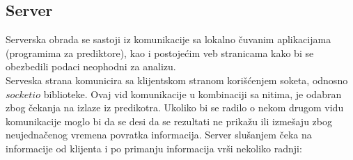 \subsection{Server} 
 Serverska obrada se sastoji iz komunikacije sa lokalno čuvanim aplikacijama (programima za prediktore), kao i postojećim veb stranicama kako bi se obezbedili podaci neophodni za analizu.\\
 
Serveska strana komunicira sa klijentskom stranom korišćenjem soketa, odnosno $socketio$ biblioteke. Ovaj vid komunikacije u kombinaciji sa nitima, je odabran zbog čekanja na izlaze iz predikotra. Ukoliko bi se radilo o nekom drugom vidu komunikacije moglo bi da se desi da se rezultati ne prikažu ili izmešaju zbog neujednačenog vremena povratka informacija. Server slušanjem čeka na informacije od klijenta i po primanju informacija vrši nekoliko radnji:
